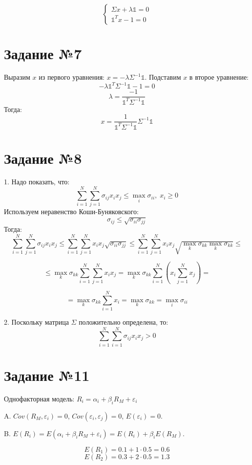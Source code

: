 \documentclass[a4paper,14pt]{extarticle}
\theoremstyle{definition}
\begin{document}
$$
\begin{cases}
    \Sigma x + \lambda \mathbb{1} = 0 \\
    \mathbb{1}^T x - 1 = 0
\end{cases}
$$

\section{Задание №7}
Выразим $x$ из первого уравнения: $x=-\lambda\Sigma^{-1}\mathbb{1}$. Подставим $x$ в второе уравнение:
$$
-\lambda\mathbb{1}^T \Sigma^{-1}\mathbb{1} - 1 = 0
$$
$$
\lambda = \dfrac{-1}{\mathbb{1}^T \Sigma^{-1}\mathbb{1}}
$$
Тогда:
$$
x= \dfrac{1}{\mathbb{1}^T \Sigma^{-1}\mathbb{1}} \Sigma^{-1}\mathbb{1}
$$
\section{Задание №8}
1. Надо показать, что:
$$
\sum_{i=1}^N \sum_{j=1}^{N} \sigma_{ij} x_i x_j \leq \max_{i} \sigma_{ii}, \; x_i \geq 0
$$
Используем неравенство Коши-Буняковского:
$$
\sigma_{ij} \leq \sqrt{\sigma_{ii} \sigma_{jj}}
$$
Тогда:
$$
\sum_{i=1}^N \sum_{j=1}^{N} \sigma_{ij} x_i x_j \leq 
\sum_{i=1}^N \sum_{j=1}^{N} x_i x_j \sqrt{\sigma_{ii} \sigma_{jj}}
\leq \sum_{i=1}^N \sum_{j=1}^{N} x_i x_j \sqrt{\max_{k} \sigma_{kk} \max_{k} \sigma_{kk}} \leq
$$

$$
\leq \max_{k} \sigma_{kk} \sum_{i=1}^N \sum_{j=1}^{N} x_i x_j = \max_{k} \sigma_{kk} \sum_{i=1}^N \left( x_i \sum_{j=1}^{N}  x_j \right) =
$$

$$
= \max_{k} \sigma_{kk} \sum_{i=1}^N x_i = \max_{k} \sigma_{kk} = \max_{i} \sigma_{ii}
$$

2. Поскольку матрица $\Sigma$ положительно определена, то:
$$
\sum_{i=1}^N \sum_{i=1}^{N} \sigma_{ij} x_i x_j > 0
$$

\section{Задание №11}
Однофакторная модель: $R_i = \alpha_i + \beta_i R_M + \varepsilon_i$

A. $Cov(R_M, \varepsilon_i)=0$, $Cov(\varepsilon_i, \varepsilon_j)=0$, $E(\varepsilon_i)=0$.

B. $E(R_i)=E(\alpha_i + \beta_i R_M + \varepsilon_i) = E(R_i) + \beta_i E(R_M)$.

$$E(R_1)= 0.1 + 1 \cdot 0.5 = 0.6$$
$$E(R_2) = 0.3 + 2 \cdot 0.5 = 1.3$$
\end{document}

